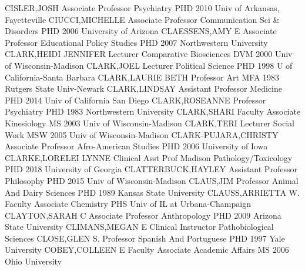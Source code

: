 \documentclass[
]{article}
\begin{document}
\textbar CISLER,JOSH \textbar Associate Professor \textbar Psychiatry
\textbar PHD 2010 Univ of Arkansas, Fayetteville \textbar{} 
\textbar CIUCCI,MICHELLE \textbar Associate Professor
\textbar Communication Sci \& Disorders \textbar PHD 2006 University of
Arizona \textbar{}  \textbar CLAESSENS,AMY E
\textbar Associate Professor \textbar Educational Policy Studies
\textbar PHD 2007 Northwestern University \textbar{} 
\textbar CLARK,HEIDI JENNIFER \textbar Lecturer \textbar Comparative
Biosciences \textbar DVM 2000 Univ of Wisconsin-Madison \textbar{}
 \textbar CLARK,JOEL \textbar Lecturer \textbar Political
Science \textbar PHD 1998 U of California-Santa Barbara \textbar{}
 \textbar CLARK,LAURIE BETH \textbar Professor \textbar Art
\textbar MFA 1983 Rutgers State Univ-Newark \textbar{} 
\textbar CLARK,LINDSAY \textbar Assistant Professor \textbar Medicine
\textbar PHD 2014 Univ of California San Diego \textbar{} 
\textbar CLARK,ROSEANNE \textbar Professor \textbar Psychiatry
\textbar PHD 1983 Northwestern University \textbar{} 
\textbar CLARK,SHARI \textbar Faculty Associate \textbar Kinesiology
\textbar MS 2003 Univ of Wisconsin-Madison \textbar{} 
\textbar CLARK,TERI \textbar Lecturer \textbar Social Work \textbar MSW
2005 Univ of Wisconsin-Madison \textbar{} 
\textbar CLARK-PUJARA,CHRISTY \textbar Associate Professor
\textbar Afro-American Studies \textbar PHD 2006 University of Iowa
\textbar{}  \textbar CLARKE,LORELEI LYNNE \textbar Clinical
Asst Prof \textbar Madison Pathology/Toxicology \textbar PHD 2018
University of Georgia \textbar{}  \textbar CLATTERBUCK,HAYLEY
\textbar Assistant Professor \textbar Philosophy \textbar PHD 2015 Univ
of Wisconsin-Madison \textbar{}  \textbar CLAUS,JIM
\textbar Professor \textbar Animal And Dairy Sciences \textbar PHD 1989
Kansas State University \textbar{}  \textbar CLAUSS,ARRIETTA
W. \textbar Faculty Associate \textbar Chemistry \textbar PHS Univ of IL
at Urbana-Champaign \textbar{}  \textbar CLAYTON,SARAH C
\textbar Associate Professor \textbar Anthropology \textbar PHD 2009
Arizona State University \textbar{}  \textbar CLIMANS,MEGAN E
\textbar Clinical Instructor \textbar Pathobiological Sciences
\textbar CLOSE,GLEN S. \textbar{}  \textbar Professor
\textbar Spanish And Portuguese \textbar PHD 1997 Yale University
\textbar COBEY,COLLEEN E \textbar{}  \textbar Faculty
Associate \textbar Academic Affairs \textbar MS 2006 Ohio University
\end{document}

